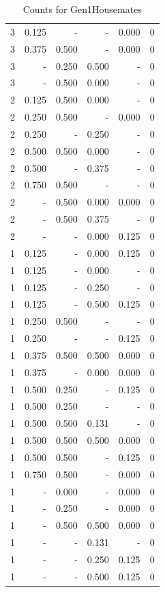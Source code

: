 \documentclass[a4paper]{article}\usepackage{graphicx, color}
\begin{document}
\begin{table}[ht]
\begin{tabular}{rrrrrr}
   \rowcolor{nullColor} 3 & 0.125 & - & - & 0.000 & 0 \\ 
  3 & 0.375 & 0.500 & - & 0.000 & 0 \\ 
   \rowcolor{badColor} 3 & - & 0.250 & 0.500 & - & 0 \\ 
   \rowcolor{badColor} 3 & - & 0.500 & 0.000 & - & 0 \\ 
   \rowcolor{badColor} 2 & 0.125 & 0.500 & 0.000 & - & 0 \\ 
  2 & 0.250 & 0.500 & - & 0.000 & 0 \\ 
   \rowcolor{sosoColor} 2 & 0.250 & - & 0.250 & - & 0 \\ 
   \rowcolor{badColor} 2 & 0.500 & 0.500 & 0.000 & - & 0 \\ 
   \rowcolor{sosoColor} 2 & 0.500 & - & 0.375 & - & 0 \\ 
  2 & 0.750 & 0.500 & - & - & 0 \\ 
   \rowcolor{badColor} 2 & - & 0.500 & 0.000 & 0.000 & 0 \\ 
  2 & - & 0.500 & 0.375 & - & 0 \\ 
   \rowcolor{sosoColor} 2 & - & - & 0.000 & 0.125 & 0 \\ 
   \rowcolor{sosoColor} 1 & 0.125 & - & 0.000 & 0.125 & 0 \\ 
   \rowcolor{sosoColor} 1 & 0.125 & - & 0.000 & - & 0 \\ 
   \rowcolor{sosoColor} 1 & 0.125 & - & 0.250 & - & 0 \\ 
   \rowcolor{sosoColor} 1 & 0.125 & - & 0.500 & 0.125 & 0 \\ 
  1 & 0.250 & 0.500 & - & - & 0 \\ 
   \rowcolor{nullColor} 1 & 0.250 & - & - & 0.125 & 0 \\ 
   \rowcolor{goodColor} 1 & 0.375 & 0.500 & 0.500 & 0.000 & 0 \\ 
   \rowcolor{sosoColor} 1 & 0.375 & - & 0.000 & 0.000 & 0 \\ 
  1 & 0.500 & 0.250 & - & 0.125 & 0 \\ 
  1 & 0.500 & 0.250 & - & - & 0 \\ 
   \rowcolor{badColor} 1 & 0.500 & 0.500 & 0.131 & - & 0 \\ 
   \rowcolor{goodColor} 1 & 0.500 & 0.500 & 0.500 & 0.000 & 0 \\ 
  1 & 0.500 & 0.500 & - & 0.125 & 0 \\ 
  1 & 0.750 & 0.500 & - & 0.000 & 0 \\ 
  1 & - & 0.000 & - & 0.000 & 0 \\ 
  1 & - & 0.250 & - & 0.000 & 0 \\ 
   \rowcolor{goodColor} 1 & - & 0.500 & 0.500 & 0.000 & 0 \\ 
   \rowcolor{sosoColor} 1 & - & - & 0.131 & - & 0 \\ 
   \rowcolor{sosoColor} 1 & - & - & 0.250 & 0.125 & 0 \\ 
   \rowcolor{sosoColor} 1 & - & - & 0.500 & 0.125 & 0 \\ 
   \hline
\end{tabular}
\caption{Counts for Gen1Housemates} 
\end{table}
\end{document}
